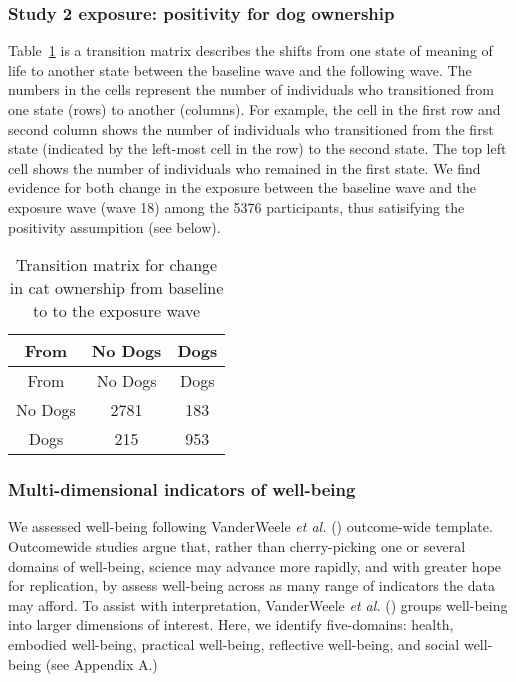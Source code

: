 \documentclass[
  singlecolumn,
  9pt]{article}
\begin{document}
\subsubsection{Study 2 exposure: positivity for dog
ownership}\label{study-2-exposure-positivity-for-dog-ownership}

Table~\ref{tbl-transition-dogs} is a transition matrix describes the
shifts from one state of meaning of life to another state between the
baseline wave and the following wave. The numbers in the cells represent
the number of individuals who transitioned from one state (rows) to
another (columns). For example, the cell in the first row and second
column shows the number of individuals who transitioned from the first
state (indicated by the left-most cell in the row) to the second state.
The top left cell shows the number of individuals who remained in the
first state. We find evidence for both change in the exposure between
the baseline wave and the exposure wave (wave 18) among the 5376
participants, thus satisifying the positivity assumpition (see below).

\begin{longtable}[]{@{}ccc@{}}
\caption{Transition matrix for change in cat ownership from baseline to
to the exposure wave}\label{tbl-transition-dogs}\tabularnewline
\toprule\noalign{}
From & No Dogs & Dogs \\
\midrule\noalign{}
\endfirsthead
\toprule\noalign{}
From & No Dogs & Dogs \\
\midrule\noalign{}
\endhead
\bottomrule\noalign{}
\endlastfoot
No Dogs & 2781 & 183 \\
Dogs & 215 & 953 \\
\end{longtable}

\subsubsection{Multi-dimensional indicators of
well-being}\label{multi-dimensional-indicators-of-well-being}

We assessed well-being following VanderWeele \emph{et al.}
() outcome-wide template.
Outcomewide studies argue that, rather than cherry-picking one or
several domains of well-being, science may advance more rapidly, and
with greater hope for replication, by assess well-being across as many
range of indicators the data may afford. To assist with interpretation,
VanderWeele \emph{et al.} () groups
well-being into larger dimensions of interest. Here, we identify
five-domains: health, embodied well-being, practical well-being,
reflective well-being, and social well-being (see Appendix A.)
\end{document}
